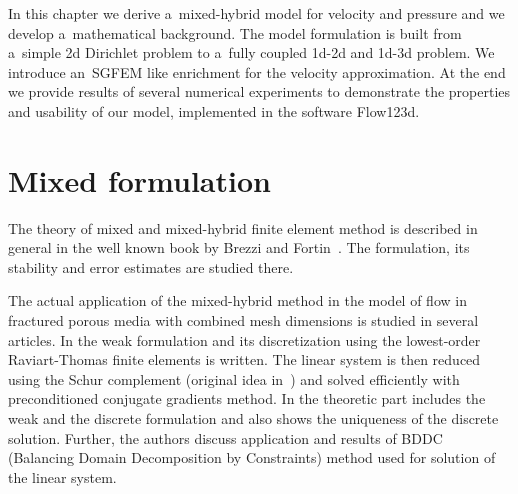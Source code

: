 
% 

In this chapter we derive a~mixed-hybrid model for velocity and pressure and we develop a~mathematical background.
The model formulation is built from a~simple 2d Dirichlet problem to a~fully coupled 1d-2d and 1d-3d problem.
We introduce an~SGFEM like enrichment for the velocity approximation.
At the end we provide results of several numerical experiments to demonstrate the properties and usability of our model,
implemented in the software Flow123d.


\section{Mixed formulation}
The theory of mixed and mixed-hybrid finite element method is described in general in the well known book by 
Brezzi and Fortin~\cite{brezzi_mixed_1991}. 
The formulation, its stability and error estimates are studied there.

The actual application of the mixed-hybrid method in the model of flow in fractured porous 
media with combined mesh dimensions is studied in several articles.
In \cite{brezina_mixed-hybrid_2010} the weak formulation and its discretization using the lowest-order Raviart-Thomas finite 
elements is written. The linear system is then reduced using the Schur complement (original idea in~\cite{maryska_mixed-hybrid_1995})
and solved efficiently with preconditioned conjugate gradients method.
In \cite{sistek_bddc_2015} the theoretic part includes the weak and the discrete formulation and also shows
the uniqueness of the discrete solution. Further, the authors discuss application and results of BDDC 
(Balancing Domain Decomposition by Constraints) method used for solution of the linear system.

